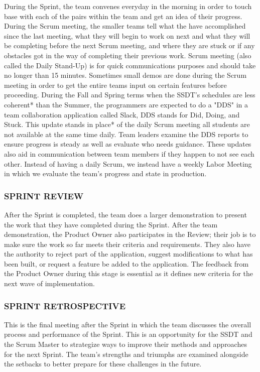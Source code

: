 During the Sprint, the team convenes everyday in the morning in order to touch base with each of the pairs within the team and get an idea of their progress. During the Scrum meeting, the smaller teams tell what the have accomplished since the last meeting, what they will begin to work on next and what they will be completing before the next Scrum meeting, and where they are stuck or if any obstacles got in the way of completing their previous work. Scrum meeting (also called the Daily Stand-Up) is for quick communications purposes and should take no longer than 15 minutes. Sometimes small demos are done during the Scrum meeting in order to get the entire teams input on certain features before proceeding. During the Fall and Spring terms when the SSDT's schedules are less coherent* than the Summer, the programmers are expected to do a "DDS" in a team collaboration application called Slack, DDS stands for Did, Doing, and Stuck. This update stands in place* of the daily Scrum meeting all students are not available at the same time daily. Team leaders examine the DDS reports to ensure progress is steady as well as evaluate who needs guidance. These updates also aid in communication between team members if they happen to not see each other. Instead of having a daily Scrum, we instead have a weekly Labor Meeting in which we evaluate the team's progress and state in production.

\subsubsection{SPRINT REVIEW}
After the Sprint is completed, the team does a larger demonstration to present the work that they have completed during the Sprint. After the team demonstration, the Product Owner also participates in the Review; their job is to make sure the work so far meets their criteria and requirements. They also have the authority to reject part of the application, suggest modifications to what has been built, or request a feature be added to the application. The feedback from the Product Owner during this stage is essential as it defines new criteria for the next wave of implementation.

\subsubsection{SPRINT RETROSPECTIVE}
This is the final meeting after the Sprint in which the team discusses the overall process and performance of the Sprint. This is an opportunity for the SSDT and the Scrum Master to strategize ways to improve their methods and approaches for the next Sprint. The team's strengths and triumphs are examined alongside the setbacks to better prepare for these challenges in the future.
